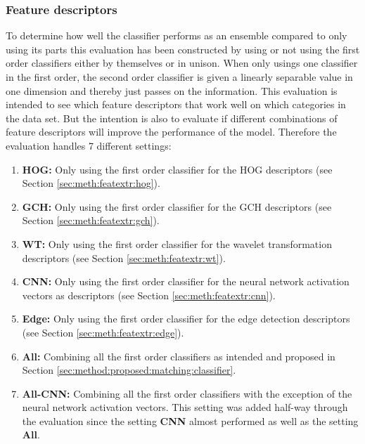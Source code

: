\subsubsection{Feature descriptors}
\label{sec:method:eval:param:features}
To determine how well the classifier performs as an ensemble compared to only using its parts this evaluation has been constructed by using or not using the first order classifiers either by themselves or in unison. When only usings one classifier in the first order, the second order classifier is given a linearly separable value in one dimension and thereby just passes on the information. This evaluation is intended to see which feature descriptors that work well on which categories in the data set. But the intention is also to evaluate if different combinations of feature descriptors will improve the performance of the model. 
Therefore the evaluation handles 7 different settings: 
\begin{enumerate}
	\item \textbf{HOG:} Only using the first order classifier for the HOG descriptors (see Section \ref{sec:meth:featextr:hog}).
	\item \textbf{GCH:} Only using the first order classifier for the GCH descriptors (see Section \ref{sec:meth:featextr:gch}).
	\item \textbf{WT:} Only using the first order classifier for the wavelet transformation descriptors (see Section \ref{sec:meth:featextr:wt}).
	\item \textbf{CNN:} Only using the first order classifier for the neural network activation vectors as descriptors (see Section \ref{sec:meth:featextr:cnn}).
	\item \textbf{Edge:} Only using the first order classifier for the edge detection descriptors (see Section \ref{sec:meth:featextr:edge}).
	\item \textbf{All:} Combining all the first order classifiers as intended and proposed in Section \ref{sec:method:proposed:matching:classifier}. 
	\item \textbf{All-CNN:} Combining all the first order classifiers with the exception of the neural network activation vectors. This setting was added half-way through the evaluation since the setting \textbf{CNN} almost performed as well as the setting \textbf{All}.
\end{enumerate}
